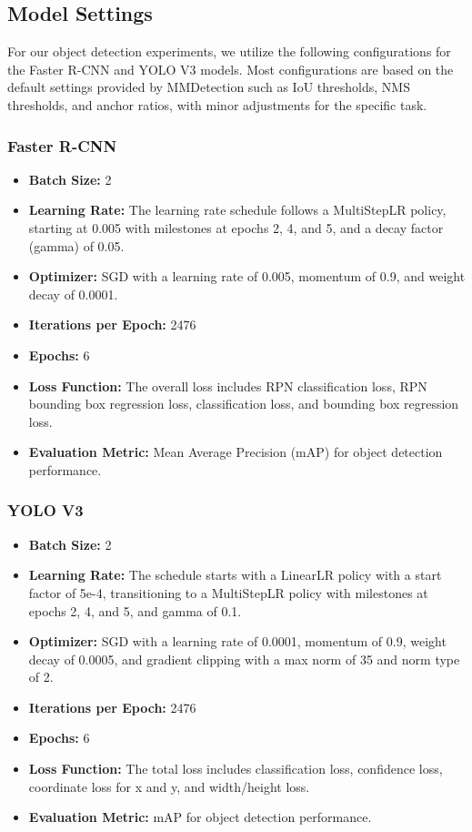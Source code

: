 \documentclass[UTF8]{ctexart}
\begin{document}
\subsection{Model Settings}
For our object detection experiments, we utilize the following configurations for the Faster R-CNN and YOLO V3 models.
Most configurations are based on the default settings provided by MMDetection such as IoU thresholds, NMS thresholds, and anchor ratios, with minor adjustments for the specific task.

\subsubsection{Faster R-CNN}
\begin{itemize}
    \item \textbf{Batch Size:} 2
    \item \textbf{Learning Rate:} The learning rate schedule follows a MultiStepLR policy, starting at 0.005 with milestones at epochs 2, 4, and 5, and a decay factor (gamma) of 0.05.
    \item \textbf{Optimizer:} SGD with a learning rate of 0.005, momentum of 0.9, and weight decay of 0.0001.
    \item \textbf{Iterations per Epoch:} 2476
    \item \textbf{Epochs:} 6
    \item \textbf{Loss Function:} The overall loss includes RPN classification loss, RPN bounding box regression loss, classification loss, and bounding box regression loss.
    \item \textbf{Evaluation Metric:} Mean Average Precision (mAP) for object detection performance.
\end{itemize}

\subsubsection{YOLO V3}
\begin{itemize}
    \item \textbf{Batch Size:} 2
    \item \textbf{Learning Rate:} The schedule starts with a LinearLR policy with a start factor of 5e-4, transitioning to a MultiStepLR policy with milestones at epochs 2, 4, and 5, and gamma of 0.1.
    \item \textbf{Optimizer:} SGD with a learning rate of 0.0001, momentum of 0.9, weight decay of 0.0005, and gradient clipping with a max norm of 35 and norm type of 2.
    \item \textbf{Iterations per Epoch:} 2476
    \item \textbf{Epochs:} 6
    \item \textbf{Loss Function:} The total loss includes classification loss, confidence loss, coordinate loss for x and y, and width/height loss.
    \item \textbf{Evaluation Metric:} mAP for object detection performance.
\end{itemize}
\end{document}
